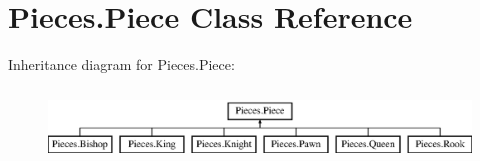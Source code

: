 \hypertarget{classMain_1_1Piece}{\section{Pieces.\-Piece Class Reference}
\label{classMain_1_1Piece}
}
Inheritance diagram for Pieces.\-Piece\-:\begin{figure}[H]
\begin{center}
\leavevmode
\includegraphics[height=2.000000cm]{classMain_1_1Piece}
\end{center}
\end{figure}

